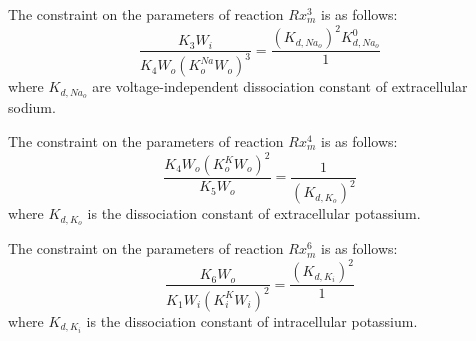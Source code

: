The constraint on the parameters of reaction $Rx_m^3$ is as follows:
\begin{equation}
      \label{eq:constraint_Nao_3}
\dfrac{K_3W_i}{K_4W_o(K_o^{Na}W_o)^3} = \dfrac{(K_{d,Na_o})^2K_{d,Na_o}^0}{1}
\end{equation}
where $K_{d,Na_o}$ are voltage-independent dissociation constant of extracellular sodium.

The constraint on the parameters of reaction $Rx_m^4$ is as follows:
\begin{equation}
      \label{eq:constraint_Ko_3}
\dfrac{K_4W_o(K_o^{K}W_o)^2}{K_5W_o} = \dfrac{1}{(K_{d,K_o})^2}
\end{equation}
where $K_{d,K_o}$ is the dissociation constant of extracellular potassium.

The constraint on the parameters of reaction $Rx_m^6$ is as follows:
\begin{equation}
      \label{eq:constraint_Ki_3}
\dfrac{K_6W_o}{K_1W_i(K_i^{K}W_i)^2} = \dfrac{(K_{d,K_i})^2}{1}
\end{equation}
where $K_{d,K_i}$ is the dissociation constant of intracellular potassium.

